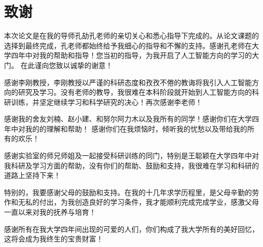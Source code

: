 \section*{致谢}

本次论文是在我的导师孔劼孔老师的亲切关心和悉心指导下完成的。从论文课题的选择到最终完成，孔老师都始终给予我细心的指导和不懈的支持。感谢孔老师在大学四年中对我的帮助和指导！您当初的指导，为我开启了人工智能方向的学习的大门。 在此谨向您致以诚挚的谢意！

感谢李刚教授，李刚教授以严谨的科研态度和孜孜不倦的教诲将我引入人工智能方向的研究及学习。没有老师的教导，我很难在本科阶段就开始到人工智能方向的科研训练，并坚定继续学习和科学研究的决心！再次感谢李老师！

感谢我的舍友刘楠、赵小建、和努尔阿力木以及我所有的同学！感谢你们在大学四年中对我的的理解和帮助！ 感谢你们在我烦恼时，倾听我的忧愁以及带给我的所有的欢乐！

感谢实验室的师兄师姐及一起接受科研训练的同门，特别是王聪颖在大学四年中对我科研及学习方面的帮助，没有你们的帮助、鼓励和支持，我很难在学习和科研的道路上坚持下来！

特别的，我要感谢父母的鼓励和支持。在我的十几年求学历程里，是父母辛勤的劳作和无私的付出，为我创造良好的学习条件，我才能顺利完成完成学业，感激父母一直以来对我的抚养与培育！

感谢所有在我大学四年间出现的可爱的人们，你们构成了我大学所有的美好回忆，这将会成为我终生的宝贵财富！


